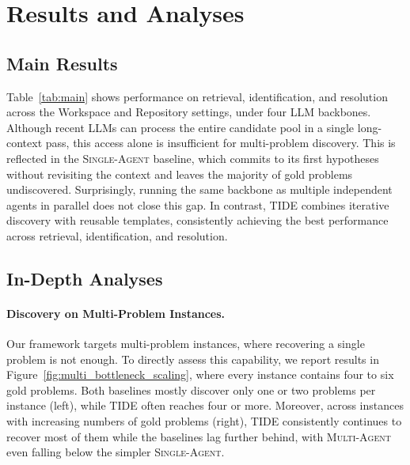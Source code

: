 \section{Results and Analyses}



\subsection{Main Results}
Table~\ref{tab:main} shows performance on retrieval, identification, and resolution across the Workspace and Repository settings, under four LLM backbones.
Although recent LLMs can process the entire candidate pool in a single long-context pass, this access alone is insufficient for multi-problem discovery.
This is reflected in the \textsc{Single-Agent} baseline, which commits to its first hypotheses without revisiting the context and leaves the majority of gold problems undiscovered.
Surprisingly, running the same backbone as multiple independent agents in parallel does not close this gap.
In contrast, \textsc{TIDE} combines iterative discovery with reusable templates, consistently achieving the best performance across retrieval, identification, and resolution.

\subsection{In-Depth Analyses}

\paragraph{Discovery on Multi-Problem Instances.}
Our framework targets multi-problem instances, where recovering a single problem is not enough.
To directly assess this capability, we report results in Figure~\ref{fig:multi_bottleneck_scaling}, where every instance contains four to six gold problems.
Both baselines mostly discover only one or two problems per instance (left), while \textsc{TIDE} often reaches four or more.
Moreover, across instances with increasing numbers of gold problems (right), \textsc{TIDE} consistently continues to recover most of them while the baselines lag further behind, with \textsc{Multi-Agent} even falling below the simpler \textsc{Single-Agent}.



